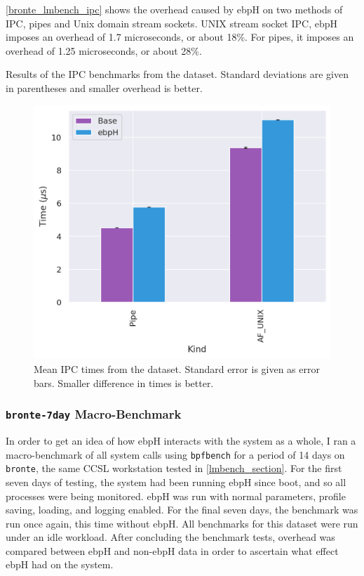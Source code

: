 \documentclass[
  12pt]{findlay}
\newcommand{\passthrough}[1]{#1}
\begin{document}
\FloatBarrier

\autoref{bronte_lmbench_ipc} shows the overhead caused by ebpH on two
methods of IPC, pipes and Unix domain stream sockets. UNIX stream socket
IPC, ebpH imposes an overhead of 1.7 microseconds, or about 18\%. For
pipes, it imposes an overhead of 1.25 microseconds, or about 28\%.

\begin{table}
    \caption[Results of the IPC benchmarks from the  dataset]{
        Results of the IPC benchmarks from the  dataset.
        Standard deviations are given in parentheses and smaller overhead is better.
    }
    \label{bronte_lmbench_ipc}
    
\end{table}

\begin{figure}
    \caption[Mean IPC times from the  dataset]{
        Mean IPC times from the  dataset.
        Standard error is given as error bars.
        Smaller difference in times is better.
    }
    \label{bronte_lmbench_ipc_graph}
    \includegraphics[width=.6\textwidth]{../data/bench/bronte-lmbench/ipc_times.png}
\end{figure}

\FloatBarrier

\hypertarget{bronte-7day-macro-benchmark}{%
\subsubsection{\texorpdfstring{\texttt{bronte-7day}
Macro-Benchmark}{bronte-7day Macro-Benchmark}}\label{bronte-7day-macro-benchmark}}

In order to get an idea of how ebpH interacts with the system as a
whole, I ran a macro-benchmark of all system calls using
\passthrough{\lstinline!bpfbench!} for a period of 14 days on
\passthrough{\lstinline!bronte!}, the same CCSL workstation tested in
\autoref{lmbench_section}. For the first seven days of testing, the
system had been running ebpH since boot, and so all processes were being
monitored. ebpH was run with normal parameters, profile saving, loading,
and logging enabled. For the final seven days, the benchmark was run
once again, this time without ebpH. All benchmarks for this dataset were
run under an idle workload. After concluding the benchmark tests,
overhead was compared between ebpH and non-ebpH data in order to
ascertain what effect ebpH had on the system.
\end{document}

